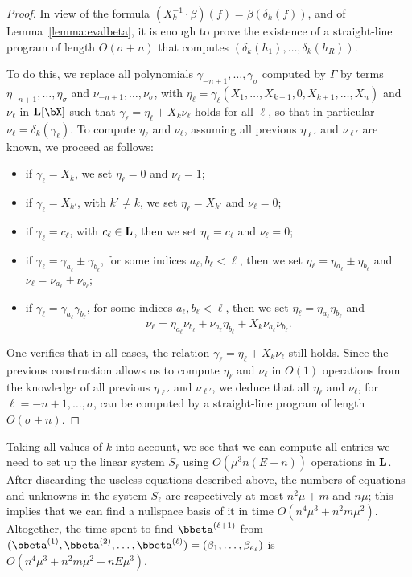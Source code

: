 \documentclass[12pt]{article}
\begin{document}
\begin{proof}
  In view of the formula $(X_k^{-1} \cdot
  \beta)(f)=\beta(\delta_k(f))$, and of Lemma~\ref{lemma:evalbeta}, it is
  enough to prove the existence of a straight-line program of length
  $O(\sigma+n)$ that computes $(\delta_k(h_1),\dots,\delta_k(h_R))$.

  To do this, we replace all polynomials
  $\gamma_{-n+1},\dots,\gamma_\sigma$ computed by $\Gamma$ by terms
  $\eta_{-n+1},\dots,\eta_\sigma$ and $\nu_{-n+1},\dots,\nu_\sigma$,
  with
  $\eta_\ell=\gamma_\ell(X_1,\dots,X_{k-1},0,X_{k+1},\dots,X_n)$
  and $\nu_\ell$ in $\LL[\bX]$ such that
  $\gamma_\ell= \eta_\ell+X_k \nu_\ell$ holds for all $\ell$, so
  that in particular $\nu_\ell=\delta_k(\gamma_\ell)$.  To compute
  $\eta_\ell$ and $\nu_\ell$, assuming all previous
  $\eta_{\ell'}$ and $\nu_{\ell'}$ are known, we proceed as
  follows:
  \begin{itemize}
  \item if $\gamma_\ell=X_k$, we set $\eta_\ell=0$ and $\nu_\ell=1$;
  \item if $\gamma_\ell=X_{k'}$, with $k' \ne k$, we set $\eta_\ell=X_{k'}$ and $\nu_\ell=0$;
  \item if $\gamma_\ell =c_\ell$, with $c_\ell \in \mathbf{L}$,
    then we set $\eta_\ell=c_\ell$ and  $\nu_\ell=0$;
  \item if $\gamma_\ell = \gamma_{a_\ell} \pm \gamma_{b_\ell}$,
    for some indices $a_\ell,b_\ell < \ell$, 
    then we set $\eta_\ell=\eta_{a_\ell}\pm\eta_{b_\ell}$
    and $\nu_\ell=\nu_{a_\ell}\pm\nu_{b_\ell}$;
\item if $\gamma_\ell = \gamma_{a_\ell} \gamma_{b_\ell}$,
      for some indices $a_\ell,b_\ell < \ell$,
    then we set $\eta_\ell=\eta_{a_\ell} \eta_{b_\ell}$
    and $$\nu_\ell=
\eta_{a_\ell} \nu_{b_\ell}
+
\nu_{a_\ell} \eta_{b_\ell}
+
X_k\nu_{a_\ell} \nu_{b_\ell}.$$
\end{itemize}
One verifies that in all cases, the relation $\gamma_\ell=
\eta_\ell+X_k \nu_\ell$ still holds. Since the previous
construction allows us to compute $\eta_\ell$ and $\nu_\ell$ in
$O(1)$ operations from the knowledge of all previous $\eta_{\ell'}$
and $\nu_{\ell'}$, we deduce that all $\eta_\ell$ and $\nu_\ell$,
for $\ell=-n+1,\dots,\sigma$, can be computed by a straight-line program of
length $O(\sigma+n)$.
\end{proof}

Taking all values of $k$ into account, we see that we can compute all
entries we need to set up the linear system $S_\ell$ using $O(\mu^3
n(E+n))$ operations in $\mathbf{L}$. After discarding the useless equations
described above, the numbers of equations and unknowns in the system
$S_\ell$ are respectively at most $n^2 \mu+m$ and $n \mu$; this
implies that we can find a nullspace basis of it in time $O(n^4 \mu^3
+ n^2 m \mu^2)$. Altogether, the time spent to find
$\bbeta^{(\ell+1)}$ from
$(\bbeta^{(1)},\bbeta^{(2)},\dots,\bbeta^{(\ell)})=(\beta_{1},\dots,\beta_{e_\ell})$
is $O(n^4 \mu^3 + n^2 m \mu^2 + n E \mu^3)$.
\end{document}
